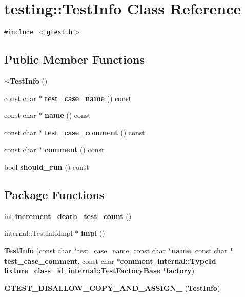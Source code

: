 \section{testing::TestInfo Class Reference}
\label{classtesting_1_1TestInfo}
{\tt \#include $<$gtest.h$>$}

\subsection*{Public Member Functions}
\begin{CompactItemize}
\item 
{\bf $\sim$TestInfo} ()
\item 
const char $\ast$ {\bf test\_\-case\_\-name} () const
\item 
const char $\ast$ {\bf name} () const
\item 
const char $\ast$ {\bf test\_\-case\_\-comment} () const
\item 
const char $\ast$ {\bf comment} () const
\item 
bool {\bf should\_\-run} () const
\end{CompactItemize}
\subsection*{Package Functions}
\begin{CompactItemize}
\item 
int {\bf increment\_\-death\_\-test\_\-count} ()
\item 
internal::TestInfoImpl $\ast$ {\bf impl} ()
\item 
{\bf TestInfo} (const char $\ast$test\_\-case\_\-name, const char $\ast${\bf name}, const char $\ast${\bf test\_\-case\_\-comment}, const char $\ast${\bf comment}, {\bf internal::TypeId} {\bf fixture\_\-class\_\-id}, {\bf internal::TestFactoryBase} $\ast${\bf factory})
\item 
{\bf GTEST\_\-DISALLOW\_\-COPY\_\-AND\_\-ASSIGN\_\-} ({\bf TestInfo})
\end{CompactItemize}
